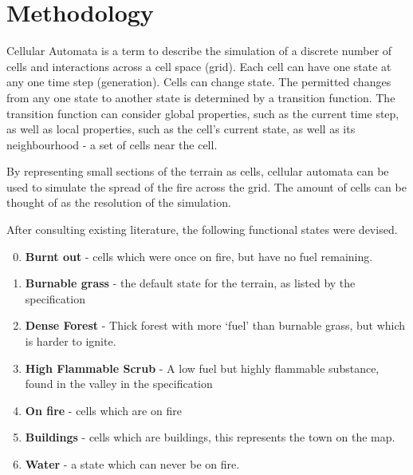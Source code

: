 \documentclass[11pt, a4paper, titlepage]{article}
\begin{document}
\section{Methodology}

Cellular Automata is a term to describe the simulation of a discrete number of cells and interactions across a cell space (grid). Each cell can have one state at any one time step (generation). Cells can change state. The permitted changes from any one state to another state is determined by a transition function. The transition function can consider global properties, such as the current time step, as well as local properties, such as the cell's current state, as well as its neighbourhood - a set of cells near the cell. 

By representing small sections of the terrain as cells, cellular automata can be used to simulate the spread of the fire across the grid. The amount of cells can be thought of as the resolution of the simulation. 

After consulting existing literature, the following functional states were devised. 

\begin{enumerate}
  \setcounter{enumi}{-1}
  \item \textbf{Burnt out} - cells which were once on fire, but have no fuel remaining.
  \item \textbf{Burnable grass} - the default state for the terrain, as listed by the specification
  \item \textbf{Dense Forest} - Thick forest with more `fuel' than burnable grass, but which is harder to ignite.
  \item \textbf{High Flammable Scrub} - A low fuel but highly flammable substance, found in the valley in the specification
  \item \textbf{On fire} - cells which are on fire
  \item \textbf{Buildings} - cells which are buildings, this represents the town on the map.
  \item \textbf{Water} - a state which can never be on fire.
\end{enumerate}
\end{document}
